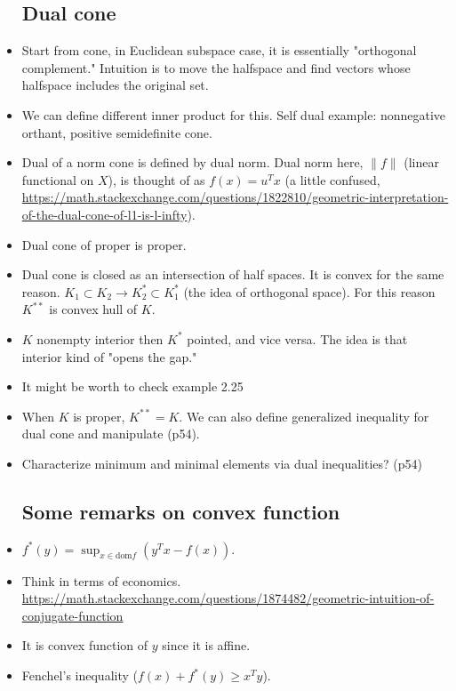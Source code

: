 \documentclass{article}
\theoremstyle{remark}
\begin{document}
\begin{itemize}
    \subsection*{Dual cone}
    \item Start from cone, in Euclidean subspace case, it is essentially "orthogonal complement." Intuition is to move the halfspace and find vectors whose halfspace includes the original set.
    \item We can define different inner product for this. Self dual example: nonnegative orthant, positive semidefinite cone.
    \item Dual of a norm cone is defined by dual norm. Dual norm here, $\lVert f \rVert$ (linear functional on $X$), is thought of as $f(x)=u^Tx$ (a little confused, \url{https://math.stackexchange.com/questions/1822810/geometric-interpretation-of-the-dual-cone-of-l1-is-l-infty}).
    \item Dual cone of proper is proper.
    \item Dual cone is closed as an intersection of half spaces. It is convex for the same reason. $K_1\subset K_2\to K_2^*\subset K_1^*$ (the idea of orthogonal space). For this reason $K^{**}$ is convex hull of $K$.
    \item $K$ nonempty interior then $K^*$ pointed, and vice versa. The idea is that interior kind of "opens the gap."
    \item It might be worth to check example 2.25
    \item When $K$ is proper, $K^{**}=K$. We can also define generalized inequality for dual cone and manipulate (p54).
    \item Characterize minimum and minimal elements via dual inequalities? (p54)
    \subsection*{Some remarks on convex function}
    \item $f^*(y)=\sup_{x\in \text{dom}f}(y^Tx-f(x))$.
    \item Think in terms of economics. \url{https://math.stackexchange.com/questions/1874482/geometric-intuition-of-conjugate-function}
    \item It is convex function of $y$ since it is affine.
    \item Fenchel's inequality ($f(x)+f^*(y)\geq x^Ty$).

\end{itemize}
\end{document}
